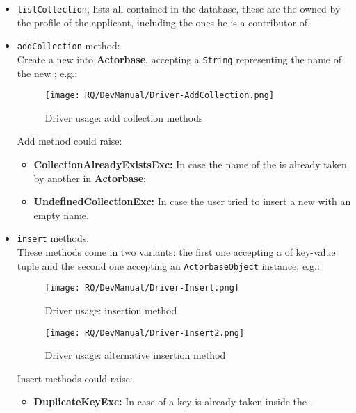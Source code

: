 \documentclass{scalatekids-article}
\begin{document}
\begin{itemize}
\item \verb=listCollection=, lists all 
  contained in the database, these are the 
  owned by the profile of the applicant, including the ones he is a contributor of.
\item \verb=addCollection= method:\\ Create a new  into \textbf{Actorbase}, accepting a \verb=String=
  representing the name of the new ;
  e.g.:
  \begin{figure}[H]
    \begin{center}
      \texttt{[image: RQ/DevManual/Driver-AddCollection.png]}
      \caption{Driver usage: add collection  methods}
    \end{center}
  \end{figure}
  Add  method could raise:
  \begin{itemize}
  \item \textbf{CollectionAlreadyExistsExc:} In case the name of the  is already taken by another  in \textbf{Actorbase};
  \item \textbf{UndefinedCollectionExc:} In case the user tried to insert a new  with an empty name.
  \end{itemize}
\item \verb=insert= methods:\\ These methods come in two variants: the first one accepting
  a  of key-value tuple and the second
  one accepting an
  \verb=ActorbaseObject= instance;
  e.g.:
  \begin{figure}[H]
    \begin{center}
      \texttt{[image: RQ/DevManual/Driver-Insert.png]}
      \caption{Driver usage: insertion method}
    \end{center}
  \end{figure}
  \begin{figure}[H]
    \begin{center}
      \texttt{[image: RQ/DevManual/Driver-Insert2.png]}
      \caption{Driver usage: alternative insertion method}
    \end{center}
  \end{figure}
  Insert methods could raise:
  \begin{itemize}
  \item \textbf{DuplicateKeyExc:} In case of a key is already taken inside the .

\end{itemize}
\end{itemize}
\end{document}
